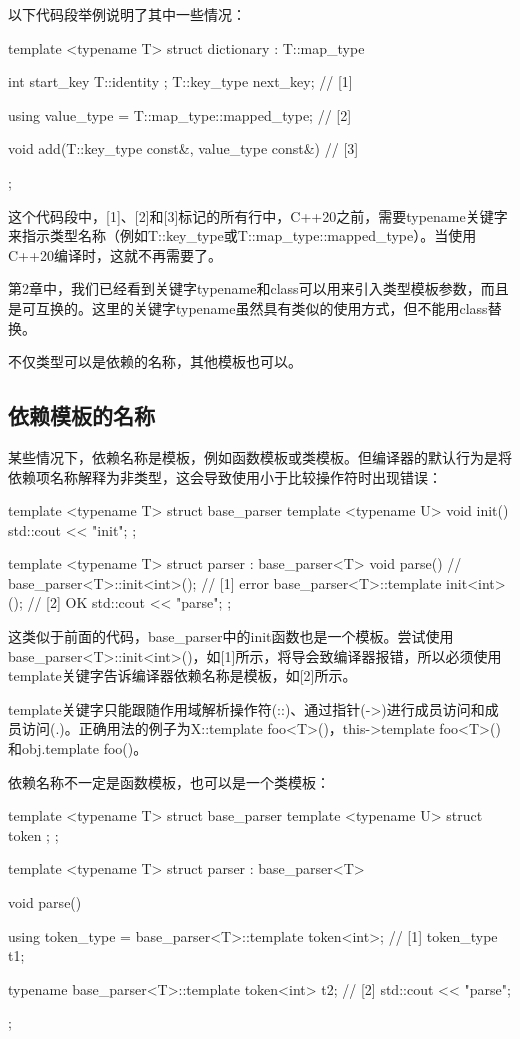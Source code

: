 以下代码段举例说明了其中一些情况：

\begin{cpp}
template <typename T>
struct dictionary : T::map_type
{
	int start_key{ T::identity };
	T::key_type next_key; // [1]

	using value_type = T::map_type::mapped_type; // [2]

	void add(T::key_type const&, value_type const&) {} // [3]
};
\end{cpp}

这个代码段中，[1]、[2]和[3]标记的所有行中，C++20之前，需要typename关键字来指示类型名称（例如T::key\_type或T::map\_type::mapped\_type）。当使用C++20编译时，这就不再需要了。

\begin{note}
第2章中，我们已经看到关键字typename和class可以用来引入类型模板参数，而且是可互换的。这里的关键字typename虽然具有类似的使用方式，但不能用class替换。
\end{note}

不仅类型可以是依赖的名称，其他模板也可以。

\subsection{依赖模板的名称}

某些情况下，依赖名称是模板，例如函数模板或类模板。但编译器的默认行为是将依赖项名称解释为非类型，这会导致使用小于比较操作符时出现错误：

\begin{cpp}
template <typename T>
struct base_parser
{
	template <typename U>
	void init()
	{
		std::cout << "init\n";
	}
};

template <typename T>
struct parser : base_parser<T>
{
	void parse()
	{
		// base_parser<T>::init<int>(); // [1] error
		base_parser<T>::template init<int>(); // [2] OK
		std::cout << "parse\n";
	}
};
\end{cpp}

这类似于前面的代码，base\_parser中的init函数也是一个模板。尝试使用base\_parser<T>::init<int>()，如[1]所示，将导会致编译器报错，所以必须使用template关键字告诉编译器依赖名称是模板，如[2]所示。

template关键字只能跟随作用域解析操作符(::)、通过指针(->)进行成员访问和成员访问(.)。正确用法的例子为X::template foo<T>()，this->template foo<T>()和obj.template foo()。

依赖名称不一定是函数模板，也可以是一个类模板：

\begin{cpp}
template <typename T>
struct base_parser
{
	template <typename U>
	struct token {};
};

template <typename T>
struct parser : base_parser<T>
{
	void parse()
	{
		using token_type =
			base_parser<T>::template token<int>; // [1]
		token_type t1{};

		typename base_parser<T>::template token<int> t2{};
		                     // [2]
		std::cout << "parse\n";
	}
};
\end{cpp}

